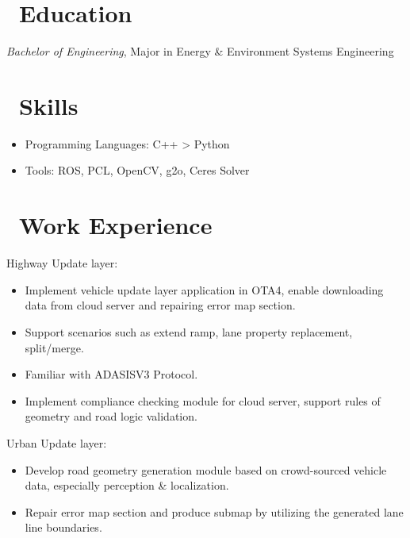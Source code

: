 \documentclass{resume}
\begin{document}



\section{\faGraduationCap\ Education}
\textit{Bachelor of Engineering}, Major in Energy \& Environment Systems Engineering

\section{\faCogs\ Skills}
\begin{itemize}[parsep=0.5ex]
  \item Programming Languages: C++ > Python
  \item Tools: ROS, PCL, OpenCV, g2o, Ceres Solver
\end{itemize}

\section{\faUsers\ Work Experience}
Highway Update layer:
\begin{itemize}
  \item Implement vehicle update layer application in OTA4, enable downloading data from cloud server and repairing error map section.
  \item Support scenarios such as extend ramp, lane property replacement, split/merge.
  \item Familiar with ADASISV3 Protocol.
  \item Implement compliance checking module for cloud server, support rules of geometry and road logic validation.
\end{itemize}

Urban Update layer:
\begin{itemize}
  \item Develop road geometry generation module based on crowd-sourced vehicle data, especially perception \& localization.
  \item Repair error map section and produce submap by utilizing the generated lane line boundaries.
\end{itemize}
\end{document}

